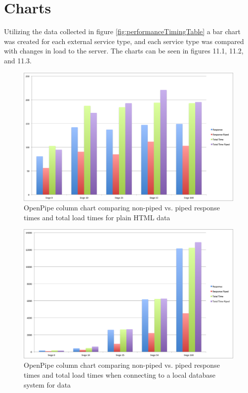 \documentclass[12pt]{report}
\begin{document}
\section{Charts}
Utilizing the data collected in figure \ref{fig:performanceTimingTable} a bar chart was created for each external service type, and  each service type was compared with changes in load to the server.  The charts can be seen in figures 11.1, 11.2, and 11.3.

\begin{figure}[H]
\label{fig:analysisChartPlain}
\centering
\includegraphics[width=\textwidth,keepaspectratio]{figures/images/analysis_chart_plain.png}
\caption{OpenPipe column chart comparing non-piped vs. piped response times and total load times for plain HTML data}
\end{figure}

\begin{figure}[H]
\label{fig:analysisChartDatabase}
\centering
\includegraphics[width=\textwidth,keepaspectratio]{figures/images/analysis_chart_database.png}
\caption{OpenPipe column chart comparing non-piped vs. piped response times and total load times when connecting to a local database system for data}
\end{figure}
\end{document}
